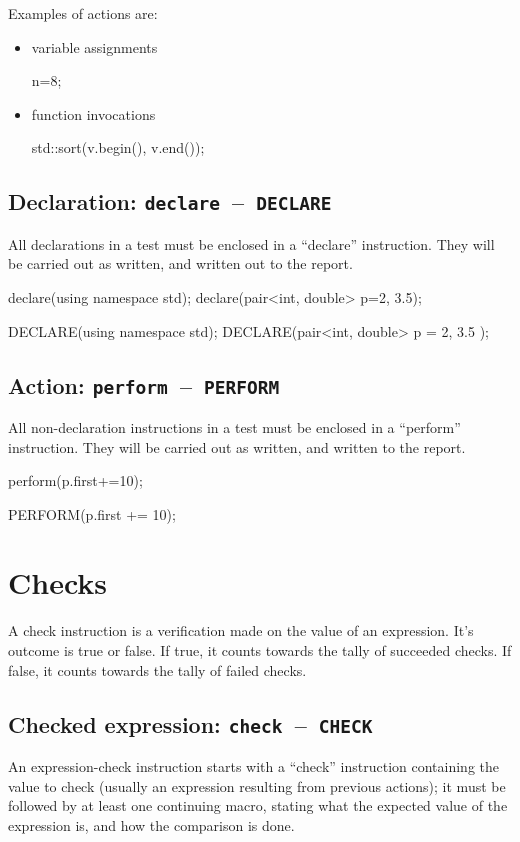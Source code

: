 \documentclass[twoside, a4paper, article]{memoir}
\newcommand*\testudocolor{\color{red!80!blue}}
\newcommand*\testudo[1]{\texttt{\testudocolor{}#1}}
\newcommand*\testudopair[2]{\testudo{#1}~--~\testudo{#2}}
\newcommand\subsectiontestudopair[3]{%
  \subsection[#1]{#1: \testudopair{#2}{#3}}}
\begin{document}
Examples of actions are:
\begin{itemize}
\item variable assignments
\begin{cpplisting}
n=8;
\end{cpplisting}

\item function invocations
\begin{cpplisting}
std::sort(v.begin(), v.end());
\end{cpplisting}
\end{itemize}

\subsectiontestudopair{Declaration}{declare}{DECLARE}
\label{sec:declaration}

All declarations in a test must be enclosed in a ``declare'' instruction.  They
will be carried out as written, and written out to the report.
\begin{cpplisting}
declare(using namespace std);
declare(pair<int, double> p={2, 3.5});
\end{cpplisting}

\begin{cpplisting}
DECLARE(using namespace std);
DECLARE(pair<int, double> p = { 2, 3.5 });
\end{cpplisting}

\subsectiontestudopair{Action}{perform}{PERFORM}
\label{sec:action}

All non-declaration instructions in a test must be enclosed in a ``perform''
instruction.  They will be carried out as written, and written to the report.
\begin{cpplisting}
perform(p.first+=10);
\end{cpplisting}

\begin{cpplisting}
PERFORM(p.first += 10);
\end{cpplisting}


\section{Checks}
\label{sec:checks}

A check instruction is a verification made on the value of an expression.  It's
outcome is true or false.  If true, it counts towards the tally of succeeded
checks.  If false, it counts towards the tally of failed checks.

\subsectiontestudopair{Checked expression}{check}{CHECK}
\label{sec:checked-expression}

An expression-check instruction starts with a ``check'' instruction containing
the value to check (usually an expression resulting from previous actions); it
must be followed by at least one continuing macro, stating what the expected
value of the expression is, and how the comparison is done.
\end{document}
